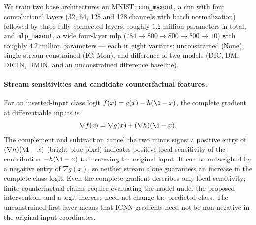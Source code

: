 We train two base architectures on MNIST: \texttt{cnn\_maxout}, a \ac{cnn} with four convolutional layers (32, 64, 128 and 128 channels with batch normalization) followed by three fully connected layers, roughly $1.2$ million parameters in total, and \texttt{mlp\_maxout}, a wide four-layer \ac{mlp} ($784 \to 800 \to 800 \to 800 \to 10$) with roughly $4.2$ million parameters --- each in eight variants: unconstrained (None), single-stream constrained (IC, Mon), and difference-of-two models (DIC, DM, DICIN, DMIN, and an unconstrained difference baseline).

\paragraph{Stream sensitivities and candidate counterfactual features.}\label{subsec:counterfactual_features}

For an inverted-input class logit $f(x)=g(x)-h(\1-x)$, the complete gradient at differentiable inputs is
\[
\nabla f(x)=\nabla g(x)+(\nabla h)(\1-x).
\]
The complement and subtraction cancel the two minus signs: a positive entry of $(\nabla h)(\1-x)$ (bright blue pixel) indicates positive local sensitivity of the contribution $-h(\1-x)$ to increasing the original input. It can be outweighed by a negative entry of $\nabla g(x)$, so neither stream alone guarantees an increase in the complete class logit. Even the complete gradient describes only local sensitivity; finite counterfactual claims require evaluating the model under the proposed intervention, and a logit increase need not change the predicted class. The unconstrained first layer means that ICNN gradients need not be non-negative in the original input coordinates.

